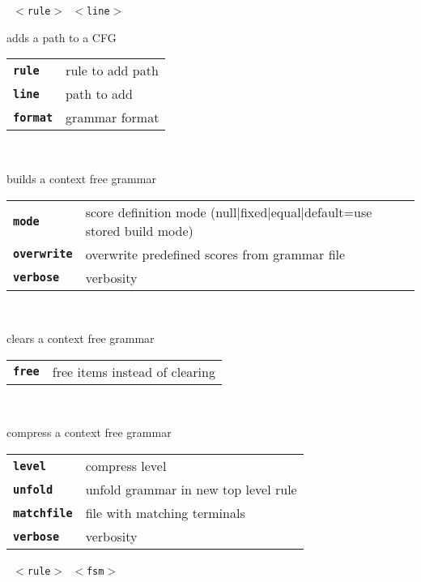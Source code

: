 \begin{description}
    \begin{description}
       \texttt{ $<$rule$>$ $<$line$>$ } \

        adds a path to a CFG

      \begin{tabular}{ll}
 \texttt{\textbf{rule}} &   rule to add path  \\
 \texttt{\textbf{line}} &   path to add  \\
 \texttt{\textbf{format}} &  grammar format  \\
      \end{tabular}
       \texttt{   } \

        builds a context free grammar

      \begin{tabular}{ll}
 \texttt{\textbf{mode}} &       score definition mode (null|fixed|equal|default=use stored build mode)  \\
 \texttt{\textbf{overwrite}} &  overwrite predefined scores from grammar file  \\
 \texttt{\textbf{verbose}} &    verbosity  \\
      \end{tabular}
       \texttt{ } \

        clears a context free grammar

      \begin{tabular}{ll}
 \texttt{\textbf{free}} &  free items instead of clearing  \\
      \end{tabular}
       \texttt{    } \

        compress a context free grammar

      \begin{tabular}{ll}
 \texttt{\textbf{level}} &      compress level  \\
 \texttt{\textbf{unfold}} &     unfold grammar in new top level rule  \\
 \texttt{\textbf{matchfile}} &  file with matching terminals  \\
 \texttt{\textbf{verbose}} &    verbosity  \\
      \end{tabular}
       \texttt{ $<$rule$>$ $<$fsm$>$} \


\end{description}
\end{description}
